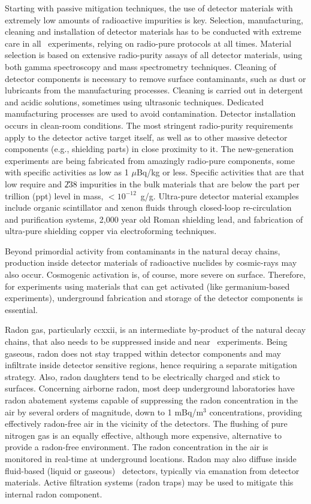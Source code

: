 Starting with passive mitigation techniques, the use of detector materials with extremely low amounts of radioactive impurities is key. Selection, manufacturing, cleaning and installation of detector materials has to be conducted with extreme care in all \bbonu\ experiments, relying on radio-pure protocols at all times. Material selection is based on extensive radio-purity assays of all detector materials, using both gamma spectroscopy and mass spectrometry techniques. Cleaning of detector components is necessary to remove surface contaminants, such as dust or lubricants from the manufacturing processes. Cleaning is carried out in detergent and acidic solutions, sometimes using ultrasonic techniques. Dedicated manufacturing processes are used to avoid contamination. Detector installation occurs in clean-room conditions. The most stringent radio-purity requirements apply to the detector active target itself, as well as to other massive detector components (e.g., shielding parts) in close proximity to it. The new-generation experiments are being fabricated from amazingly radio-pure components, some with specific activities as low as 1 $\mu$Bq/kg or less. Specific activities that are that low require  and \U{238} impurities in the bulk materials that are below the part per trillion (ppt) level in mass, $<10^{-12}$~g/g. Ultra-pure detector material examples include organic scintillator and xenon fluids through closed-loop re-circulation and purification systems, 2,000 year old Roman shielding lead, and fabrication of ultra-pure shielding copper via electroforming techniques.

Beyond primordial activity from contaminants in the natural decay chains, production inside detector materials of radioactive nuclides by cosmic-rays may also occur. Cosmogenic activation is, of course, more severe on surface. Therefore, for experiments using materials that can get activated (like germanium-based experiments), underground fabrication and storage of the detector components is essential.

Radon gas, particularly \Rn{222}, is an intermediate by-product of the natural decay chains, that also needs to be suppressed inside and near \bbonu\ experiments. Being gaseous, radon does not stay trapped within detector components and may infiltrate inside detector sensitive regions, hence requiring a separate mitigation strategy. Also, radon daughters tend to be electrically charged and stick to surfaces. Concerning airborne radon, most deep underground laboratories have radon abatement systems capable of suppressing the radon concentration in the air by several orders of magnitude, down to 1 mBq/m$^3$ concentrations, providing effectively radon-free air in the vicinity of the detectors. The flushing of pure nitrogen gas is an equally effective, although more expensive, alternative to provide a radon-free environment. The radon concentration in the air is monitored in real-time at underground locations. Radon may also diffuse inside fluid-based (liquid or gaseous) \bbonu\ detectors, typically via emanation from detector materials. Active filtration systems (radon traps) may be used to mitigate this internal radon component.

